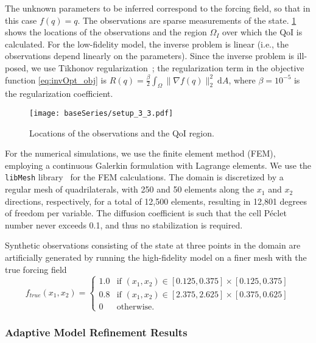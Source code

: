The unknown parameters to be inferred correspond to the forcing field, so that in this case $f(q)=q$. The observations are sparse measurements of the state.
\cref{fig:baseSetup} shows the locations of the observations and the region $\Omega_I$ over which the QoI is calculated. For the low-fidelity model, the inverse problem is linear (i.e., the observations depend linearly on the parameters). Since the inverse problem is ill-posed, we use Tikhonov regularization~\cite{EngHanNeu00}; the regularization term in the objective function \cref{eq:invOpt_obj} is $R(q)=\frac{\beta}{2}\int_\Omega \|\nabla f(q)\|_2^2\:\textrm{d}A$, where $\beta=10^{-5}$ is the regularization coefficient.
%
\begin{figure}[htbp]
\centering
\texttt{[image: baseSeries/setup\_3\_3.pdf]}
\caption{Locations of the observations and the QoI region.}
\label{fig:baseSetup}
\end{figure}
%

For the numerical simulations, we use the finite element method (FEM), employing a continuous Galerkin formulation with Lagrange elements. We use the \texttt{libMesh} library~\cite{libMeshPaper} for the FEM calculations.
The domain is discretized by a regular mesh of quadrilaterals, with 250 and 50 elements along the $x_1$ and $x_2$ directions, respectively, for a total of 12,500 elements, resulting in 12,801 degrees of freedom per variable. The diffusion coefficient is such that the cell P\'{e}clet number never exceeds 0.1, and thus no stabilization is required.

Synthetic observations consisting of the state at three points in the domain are artificially generated by running the high-fidelity model on a finer mesh with the true forcing field
%
\begin{equation}
f_{true}(x_1,x_2)=
\begin{cases}
1.0 & \textrm{if }(x_1,x_2)\in[0.125,0.375]\times[0.125,0.375] \\
0.8 & \textrm{if }(x_1,x_2)\in[2.375,2.625]\times[0.375,0.625] \\
0 & \textrm{otherwise}.
\end{cases}
\end{equation}
%
%
\subsubsection{Adaptive Model Refinement Results} \label{sec:cdvcdrBaseRef}
%

